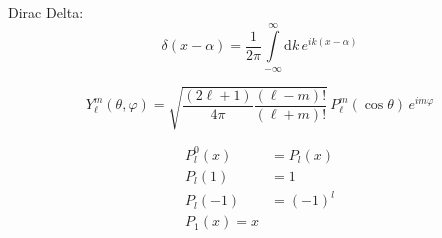 \documentclass[a4paper]{article}
\begin{document}
Dirac Delta:
\begin{equation}
    \delta(x-\alpha) = \frac{1}{2\pi} \int\limits_{-\infty}^{\infty} \mathrm{d}k \, e^{ik(x-\alpha)}
\end{equation}

\begin{equation}
    Y_\ell^m( \theta , \varphi ) = \sqrt{\frac{(2\ell+1)}{ 4\pi}\frac{(\ell-m)! }{ (\ell+m)!}}  \, P_\ell^m ( \cos{\theta} ) \, e^{i m \varphi }
\end{equation}


\begin{align}
    P_{l}^{0}(x) &= P_{l}(x) \\
    P_{l}(1) &= 1 \\
    P_{l}(-1) &= (-1)^{l} \\
    P_{1}(x) = x
\end{align}
\end{document}
